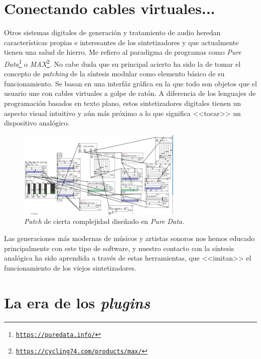 \section{Conectando cables virtuales...}

Otros sistemas digitales de generación y tratamiento de audio heredan características propias e interesantes de los sintetizadores y que actualmente tienen una salud de hierro. Me refiero al paradigma de programas como \emph{Pure Data}\footnote{\href{https://puredata.info/}{\texttt{https://puredata.info/}}} o \emph{MAX}\footnote{\href{https://cycling74.com/products/max/}{\texttt{https://cycling74.com/products/max/}}}. No cabe duda que su principal acierto ha sido la de tomar el concepto de \emph{patching} de la síntesis modular como elemento básico de su funcionamiento. Se basan en una interfáz gráfica en la que todo son objetos que el usuario une con cables virtuales a golpe de ratón. A diferencia de los lenguajes de programación basados en texto plano, estos sintetizadores digitales tienen un aspecto visual intuitivo y aún más próximo a lo que significa <<tocar>> un dispositivo analógico. 

\begin{figure}
	\centering
	\includegraphics[width=0.7\textwidth]{./puredata_modular}
	\caption[\textit{Patch} en \textit{Pure Data}]{\textit{Patch} de cierta complejidad diseñado en \textit{Pure Data. }}
	\label{fig:puredata_modular}
\end{figure}

Las generaciones más modernas de músicos y artistas sonoros nos hemos educado principalmente con este tipo de software, y nuestro contacto con la síntesis analógica ha sido aprendida a través de estas herramientas, que <<imitan>> el funcionamiento de los viejos sintetizadores.

\section{La era de los \textit{plugins}}


